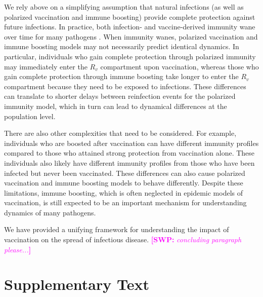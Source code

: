 \documentclass[12pt]{article}
\newcommand{\comment}{\showcomment}
\newcommand{\showcomment}[3]{\textcolor{#1}{\textbf{[#2: }\textsl{#3}\textbf{]}}}
\newcommand{\swp}[1]{\comment{magenta}{SWP}{#1}}
\begin{document}
We rely above on a simplifying assumption that natural infections (as well as polarized vaccination and immune boosting) provide complete protection against future infections.
In practice, both infection- and vaccine-derived immunity wane over time for many pathogens \citep{heffernan2009implications,lewnard2018vaccine,perez2022}.
When immunity wanes, polarized vaccination and immune boosting models may not necessarily predict identical dynamics.
In particular, individuals who gain complete protection through polarized immunity may immediately enter the $R_v$ compartment upon vaccination, whereas those who gain complete protection through immune boosting take longer to enter the $R_v$ compartment because they need to be exposed to infections.
These differences can translate to shorter delays between reinfection events for the polarized immunity model, which in turn can lead to dynamical differences at the population level.

There are also other complexities that need to be considered.
For example, individuals who are boosted after vaccination can have different immunity profiles compared to those who attained strong protection from vaccination alone.
These individuals also likely have different immunity profiles from those who have been infected but never been vaccinated.
These differences can also cause polarized vaccination and immune boosting models to behave differently.
Despite these limitations, immune boosting, which is often neglected in epidemic models of vaccination, is still expected to be an important mechanism for understanding dynamics of many pathogens.

We have provided a unifying framework for understanding the impact of vaccination on the spread of infectious disease.
\swp{concluding paragraph please...}

\pagebreak

\section*{Supplementary Text}
\end{document}
